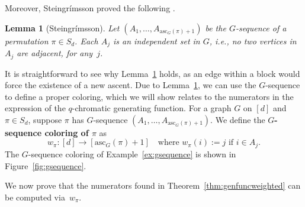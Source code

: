 \documentclass[11pt]{amsart}
\newtheorem{lemma}[theorem]{Lemma}
\newcommand\Def[1]{{\bf #1}}
\newcommand{\ascnum}{\mathrm{asc}}
\begin{document}
Moreover, Steingrímsson proved the following \cite[Lemma~4]{steingrimssoncoloring}.

\begin{lemma}[Steingrímsson]\label{lem:independentgsequence}
    Let $(A_1,\ldots, A_{\ascnum_G(\pi)+1})$ be the $G$-sequence of a permutation $\pi \in S_d$. 
    Each $A_j$ is an independent set in $G$, i.e., no two vertices in $A_j$ are adjacent, for any~$j$.
\end{lemma}

It is straightforward to see why Lemma~\ref{lem:independentgsequence} holds, as an edge within a block would force the existence of a new ascent.
Due to Lemma~\ref{lem:independentgsequence}, we can use the $G$-sequence to define a proper coloring, which we will show relates to the numerators in the expression of the $q$-chromatic generating function.
For a graph $G$ on $[d]$ and $\pi \in S_d$, suppose $\pi$ has $G$-sequence $(A_1,\ldots,A_{\ascnum_G(\pi)+1})$.
We define the \Def{$G$-sequence coloring of $\pi$} as 
\[
    w_{\pi}: [d] \to [\ascnum_G(\pi)+1] \quad \text{where } w_\pi(i) :=j \text{ if } i \in A_j.
\]
The $G$-sequence coloring of Example~\ref{ex:gsequence} is shown in Figure~\ref{fig:gsequence}.

We now prove that the numerators found in Theorem~\ref{thm:genfuncweighted} can be computed via~$w_{\pi}$.
\end{document}
